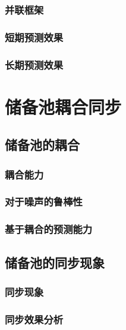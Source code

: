 \documentclass[notitlepage,cs4size,punct,oneside]{ctexrep}
\numberwithin{equation}{chapter}
\theoremstyle{mystyle}
\begin{document}
\subsection{并联框架}

\subsection{短期预测效果}

\subsection{长期预测效果}


\chapter{储备池耦合同步}

\section{储备池的耦合}

\subsection{耦合能力}

\subsection{对于噪声的鲁棒性}

\subsection{基于耦合的预测能力}

\section{储备池的同步现象}

\subsection{同步现象}

\subsection{同步效果分析}
\end{document}
